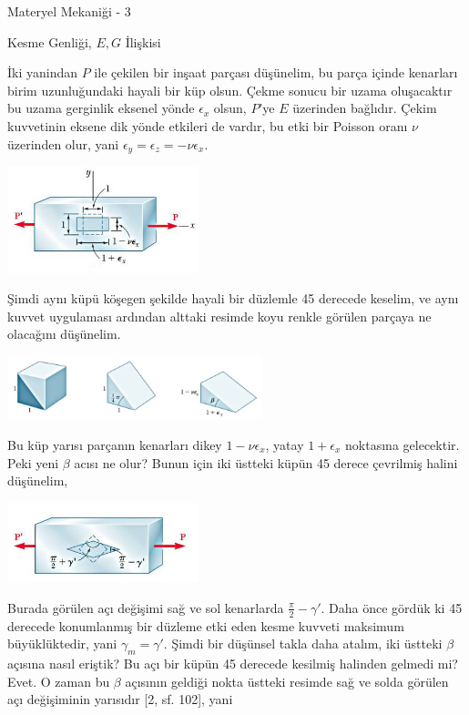 \documentclass[12pt,fleqn]{article}\usepackage{../../common}
\begin{document}
Materyel Mekaniği - 3

Kesme Genliği, $E,G$ İlişkisi

İki yanindan $P$ ile çekilen bir inşaat parçası düşünelim, bu parça içinde
kenarları birim uzunluğundaki hayali bir küp olsun. Çekme sonucu bir uzama
oluşacaktır bu uzama gerginlik eksenel yönde $\epsilon_x$ olsun, $P$'ye
$E$ üzerinden bağlıdır. Çekim kuvvetinin eksene dik yönde etkileri de vardır,
bu etki bir Poisson oranı $\nu$ üzerinden olur, yani
$\epsilon_y = \epsilon_z = -\nu \epsilon_x$.

\includegraphics[width=15em]{phy_020_strs_06_07.jpg}

Şimdi aynı küpü köşegen şekilde hayali bir düzlemle 45 derecede keselim, ve aynı
kuvvet uygulaması ardından alttaki resimde koyu renkle görülen parçaya
ne olacağını düşünelim.

\includegraphics[width=20em]{phy_020_strs_06_08.jpg}

Bu küp yarısı parçanın kenarları dikey $1-\nu \epsilon_x$, yatay $1 + \epsilon_x$
noktasına gelecektir. Peki yeni $\beta$ acısı ne olur? Bunun için iki
üstteki küpün 45 derece çevrilmiş halini düşünelim,

\includegraphics[width=15em]{phy_020_strs_06_09.jpg}

Burada görülen açı değişimi sağ ve sol kenarlarda $\frac{\pi}{2} - \gamma'$.
Daha önce gördük ki 45 derecede konumlanmış bir düzleme etki eden kesme
kuvveti maksimum büyüklüktedir, yani $\gamma_m = \gamma'$. Şimdi bir düşünsel
takla daha atalım, iki üstteki $\beta$ açısına nasıl eriştik? Bu açı bir küpün
45 derecede kesilmiş halinden gelmedi mi? Evet. O zaman bu $\beta$ açısının
geldiği nokta üstteki resimde sağ ve solda görülen açı değişiminin yarısıdır
[2, sf. 102], yani
\end{document}
